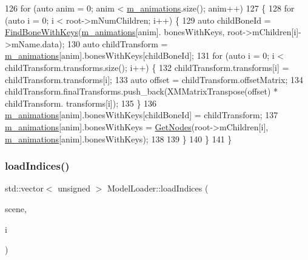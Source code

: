\begin{DoxyCode}
126     \textcolor{keywordflow}{for} (\textcolor{keyword}{auto} anim = 0; anim < \mbox{\hyperlink{class_model_loader_a2b9cf4d8fe3432ddc656651057c78860}{m\_animations}}.size(); anim++)
127     \{
128         \textcolor{keywordflow}{for} (\textcolor{keyword}{auto} i = 0; i < root->mNumChildren; i++) \{
129             \textcolor{keyword}{auto} childBoneId = \mbox{\hyperlink{class_model_loader_a5356ad9c0e77c4b5142c1c1400b01048}{FindBoneWithKeys}}(\mbox{\hyperlink{class_model_loader_a2b9cf4d8fe3432ddc656651057c78860}{m\_animations}}[anim].
      bonesWithKeys, root->mChildren[i]->mName.data);
130             \textcolor{keyword}{auto} childTransform = \mbox{\hyperlink{class_model_loader_a2b9cf4d8fe3432ddc656651057c78860}{m\_animations}}[anim].bonesWithKeys[childBoneId];
131             \textcolor{keywordflow}{for} (\textcolor{keyword}{auto} i = 0; i < childTransform.transforms.size(); i++) \{
132                 childTransform.transforms[i] = childTransform.transforms[i];
133                 \textcolor{keyword}{auto} offset = childTransform.offsetMatrix;
134                 childTransform.finalTransforms.push\_back(XMMatrixTranspose(offset) * childTransform.
      transforms[i]);
135             \}
136             \mbox{\hyperlink{class_model_loader_a2b9cf4d8fe3432ddc656651057c78860}{m\_animations}}[anim].bonesWithKeys[childBoneId] = childTransform;
137             \mbox{\hyperlink{class_model_loader_a2b9cf4d8fe3432ddc656651057c78860}{m\_animations}}[anim].bonesWithKeys = \mbox{\hyperlink{class_model_loader_afabe255fd413f08ac9939e786f26aee4}{GetNodes}}(root->mChildren[i], 
      \mbox{\hyperlink{class_model_loader_a2b9cf4d8fe3432ddc656651057c78860}{m\_animations}}[anim].bonesWithKeys);
138 
139         \}
140     \}
141 \}
\end{DoxyCode}
\mbox{\label{class_model_loader_aade9d7c2c0a8a13800700ee3b4b930ef}} 
\subsubsection{\texorpdfstring{load\+Indices()}{loadIndices()}}
{\footnotesize\ttfamily std\+::vector$<$ unsigned $>$ Model\+Loader\+::load\+Indices (\begin{DoxyParamCaption}\item[{const ai\+Scene $\ast$}]{scene,  }\item[{const int}]{i }\end{DoxyParamCaption})\hspace{0.3cm}{\ttfamily [private]}}



